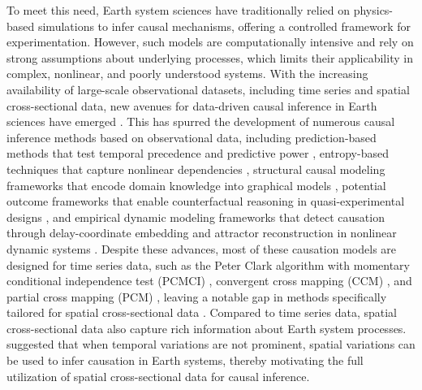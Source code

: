 \documentclass[authoryear,preprint,review,12pt]{elsarticle}
\begin{document}
To meet this need, Earth system sciences have traditionally relied on physics-based simulations to infer causal mechanisms, offering a controlled framework for experimentation. However, such models are computationally intensive and rely on strong assumptions about underlying processes, which limits their applicability in complex, nonlinear, and poorly understood systems. With the increasing availability of large-scale observational datasets, including time series and spatial cross-sectional data, new avenues for data-driven causal inference in Earth sciences have emerged \citep{runge2019esstsc,runge2023tsc}. This has spurred the development of numerous causal inference methods based on observational data, including prediction-based methods that test temporal precedence and predictive power \citep{granger1969grangertest,geweke1982grangertest2}, entropy-based techniques that capture nonlinear dependencies \citep{schreiber2000te1,vicente2010te2,sun2014ce1}, structural causal modeling frameworks that encode domain knowledge into graphical models \citep{pearl2000scm2,pearl2009scm3,pearl2018scm4}, potential outcome frameworks that enable counterfactual reasoning in quasi-experimental designs \citep{rubin1974pom1,rubin1986pom2,rubin2005pom3}, and empirical dynamic modeling frameworks that detect causation through delay-coordinate embedding and attractor reconstruction in nonlinear dynamic systems \citep{sugihara2012ccm,ma2014cms,clark2015multispatialccm}. Despite these advances, most of these causation models are designed for time series data, such as the Peter Clark algorithm with momentary conditional independence test (PCMCI) \citep{runge2019pcmci}, convergent cross mapping (CCM) \citep{sugihara2012ccm}, and partial cross mapping (PCM) \citep{leng2020pcm}, leaving a notable gap in methods specifically tailored for spatial cross-sectional data \citep{gao2022ciss,gao2023gccm}. Compared to time series data, spatial cross-sectional data also capture rich information about Earth system processes. \cite{gao2022tscess} suggested that when temporal variations are not prominent, spatial variations can be used to infer causation in Earth systems, thereby motivating the full utilization of spatial cross-sectional data for causal inference.
\end{document}
